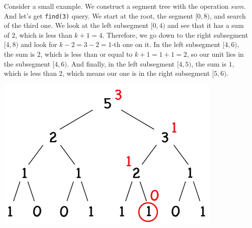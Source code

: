 \documentclass[11pt]{article}
\begin{document}
Consider a small example. We construct a segment tree with the operation \(sum\). And let's get
\texttt{find(3)} query. We start at the root, the segment \([0, 8)\), and search of the third one. We
look at the left subsegment \([0, 4)\) and see that it has a sum of \(2\), which is less than \(k + 1
    = 4\). Therefore, we go down to the right subsegment \([4, 8)\) and look for \(k - 2 = 3 - 2 =
    1\)-th one on it. In the left subsegment \([4, 6)\), the sum is \(2\), which is less than or equal
to \(k + 1 = 1 + 1 = 2\), so our unit lies in the subsegment \([4, 6)\). And finally, in the left
subsegment \([4, 5)\), the sum is \(1\), which is less than \(2\), which means our one is in the right
subsegment \([5, 6)\).
\begin{center}
\includegraphics[width=.9\linewidth]{./images/segment-tree-8.png}
\end{center}
\end{document}

